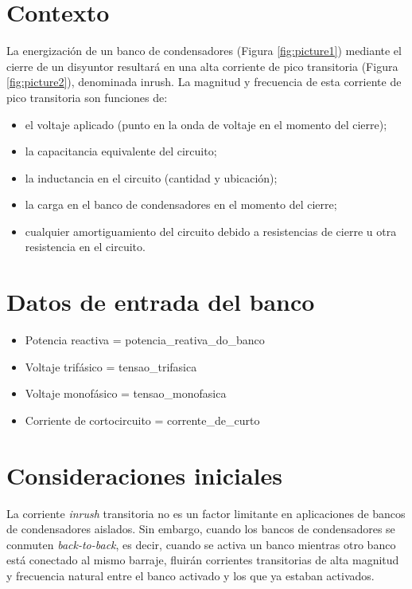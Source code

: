 \documentclass[a4paper]{article}
\begin{document}
	
	\section{Contexto}
	La energización de un banco de condensadores (Figura \ref{fig:picture1}) mediante el cierre de un disyuntor resultará en una alta corriente de pico transitoria (Figura \ref{fig:picture2}), denominada inrush. La magnitud y frecuencia de esta corriente de pico transitoria son funciones de:
	\begin{itemize}[label=\textendash]
		\item el voltaje aplicado (punto en la onda de voltaje en el momento del cierre);
		\item la capacitancia equivalente del circuito;
		\item la inductancia en el circuito (cantidad y ubicación);
		\item la carga en el banco de condensadores en el momento del cierre;
		\item cualquier amortiguamiento del circuito debido a resistencias de cierre u otra resistencia en el circuito.
	\end{itemize}
	
	\section{Datos de entrada del banco}
	\begin{itemize}[label=\textendash]
		\item Potencia reactiva  = {{potencia_reativa_do_banco}}
		\item Voltaje trifásico  = {{tensao_trifasica}}
		\item Voltaje monofásico  = {{tensao_monofasica}}
		\item Corriente de cortocircuito  = {{corrente_de_curto}}
	\end{itemize}
	
	\begin{center}
	\end{center}
	
	\section{Consideraciones iniciales}
	
	La corriente \textit{inrush} transitoria no es un factor limitante en aplicaciones de bancos de condensadores aislados. Sin embargo, cuando los bancos de condensadores se conmuten \textit{back-to-back}, es decir, cuando se activa un banco mientras otro banco está conectado al mismo barraje, fluirán corrientes transitorias de alta magnitud y frecuencia natural entre el banco activado y los que ya estaban activados.
	
\end{document}
